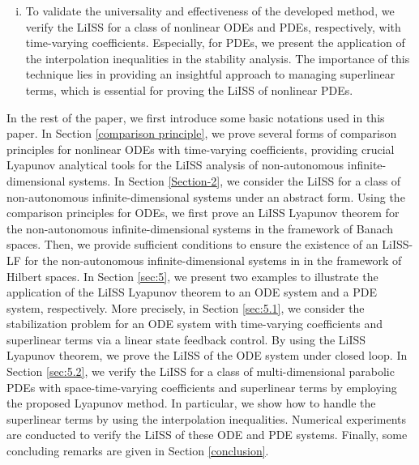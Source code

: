 \documentclass[onecolumn]{autart}
\newenvironment{proof of Prop.ODE}{{\it Proof of Proposition~\ref{Prop.ODE}:\enspace}}{\hfill $\blacksquare$\par}
\newenvironment{proof of PDE}{{\it Proof of Proposition \ref{Prop.8}:\enspace}}{\hfill $\blacksquare$\par}
\begin{document}
{\begin{enumerate}[(i)]
		\item    To validate the universality and effectiveness of the developed method, we     verify the LiISS for a class of nonlinear ODEs  and PDEs, respectively,  with  time-varying coefficients. Especially, {for PDEs, we present the application of the  interpolation inequalities in the stability analysis. The   importance  of this technique lies in providing an  insightful approach to managing superlinear terms, which is essential for  proving the LiISS of nonlinear PDEs.}
	\end{enumerate}
	
	In the rest of the paper, we first introduce  some basic notations used in this paper. In Section \ref{comparison principle}, we prove several forms of {comparison principles} for nonlinear  ODEs with time-varying coefficients,   providing crucial Lyapunov analytical tools for the LiISS analysis of
	non-autonomous infinite-dimensional systems.  In Section \ref{Section-2}, we consider the LiISS for a class of  non-autonomous infinite-dimensional systems under an abstract form.  Using the comparison principles for ODEs, we first prove an LiISS Lyapunov  theorem for the  non-autonomous infinite-dimensional systems   in the  framework of   Banach spaces. Then, we provide sufficient conditions to ensure the existence of an LiISS-LF  for  the non-autonomous infinite-dimensional systems in in the  framework of   Hilbert spaces.   In Section \ref{sec:5},  we present two examples to illustrate the application of the LiISS Lyapunov  theorem to an ODE system and a PDE system, respectively. More precisely, in Section \ref{sec:5.1}, we consider the stabilization problem for an ODE system with time-varying coefficients and superlinear terms via a  linear state feedback control. By  using the  LiISS Lyapunov  theorem, we prove the LiISS of the ODE system under closed loop. In  Section \ref{sec:5.2}, we verify the LiISS for a class of multi-dimensional
	parabolic PDEs with space-time-varying coefficients and superlinear terms by employing the proposed Lyapunov method. In
	particular, we show how to handle the superlinear terms by using the  interpolation inequalities.  Numerical experiments are conducted to verify the LiISS of these ODE and PDE systems. Finally, some concluding remarks are given in Section \ref{conclusion}.
	
}
\end{document}
